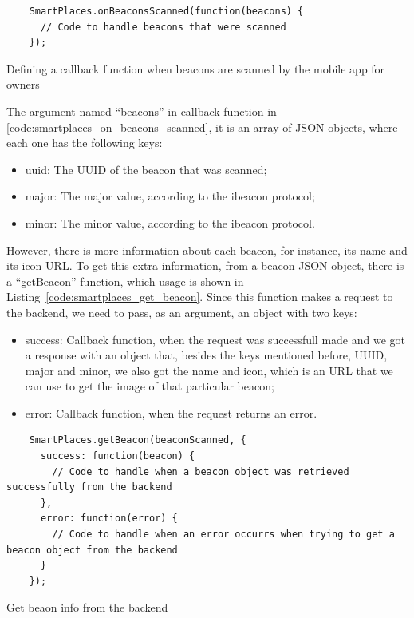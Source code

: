 \begin{listing}[H]
  \begin{verbatim}
    SmartPlaces.onBeaconsScanned(function(beacons) {
      // Code to handle beacons that were scanned
    });
  \end{verbatim}
  \caption[Beacons scanned]{Defining a callback function when beacons are scanned by the mobile app for owners}
  \label{code:smartplaces_on_beacons_scanned}
\end{listing}

The argument named ``beacons'' in callback function in \ref{code:smartplaces_on_beacons_scanned}, it is an array of \gls{JSON} objects, where each one has the following keys:
\begin{itemize}
  \item uuid: The \gls{UUID} of the beacon that was scanned;
  \item major: The major value, according to the ibeacon protocol;
  \item minor: The minor value, according to the ibeacon protocol.
\end{itemize}

However, there is more information about each beacon, for instance, its name and its icon \gls{URL}.
To get this extra information, from a beacon \gls{JSON} object, there is a ``getBeacon'' function, which usage is shown in Listing~\ref{code:smartplaces_get_beacon}.
Since this function makes a request to the backend, we need to pass, as an argument, an object with two keys:
\begin{itemize}
  \item success: Callback function, when the request was successfull made and we got a response with an object that, besides the keys mentioned before, \gls{UUID}, major and minor, we also got the name and icon, which is an \gls{URL} that we can use to get the image of that particular beacon;
  \item error: Callback function, when the request returns an error.
\end{itemize}

\begin{listing}[H]
  \begin{verbatim}
    SmartPlaces.getBeacon(beaconScanned, {
      success: function(beacon) {
        // Code to handle when a beacon object was retrieved successfully from the backend
      },
      error: function(error) {
        // Code to handle when an error occurrs when trying to get a beacon object from the backend
      }
    });
  \end{verbatim}
  \caption[Get beacon object]{Get beaon info from the backend}
  \label{code:smartplaces_get_beacon}
\end{listing}

